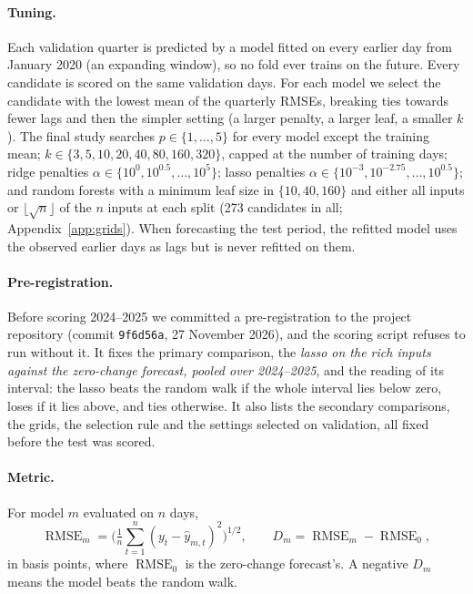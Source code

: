 \documentclass{article}
\newcommand{\RMSE}{\operatorname{RMSE}}
\begin{document}
\paragraph{Tuning.} Each validation quarter is predicted by a model fitted on every earlier day from January 2020 (an expanding window), so no fold ever trains on the future. Every candidate is scored on the same validation days. For each model we select the candidate with the lowest mean of the quarterly RMSEs, breaking ties towards fewer lags and then the simpler setting (a larger penalty, a larger leaf, a smaller $k$). The final study searches $p \in \{1, \ldots, 5\}$ for every model except the training mean; $k \in \{3, 5, 10, 20, 40, 80, 160, 320\}$, capped at the number of training days; ridge penalties $\alpha \in \{10^0, 10^{0.5}, \ldots, 10^5\}$; lasso penalties $\alpha \in \{10^{-3}, 10^{-2.75}, \ldots, 10^{0.5}\}$; and random forests with a minimum leaf size in $\{10, 40, 160\}$ and either all inputs or $\lfloor\sqrt{n}\rfloor$ of the $n$ inputs at each split (273 candidates in all; Appendix~\ref{app:grids}). When forecasting the test period, the refitted model uses the observed earlier days as lags but is never refitted on them.

\paragraph{Pre-registration.} Before scoring 2024--2025 we committed a pre-registration to the project repository (commit \texttt{9f6d56a}, 27 November 2026), and the scoring script refuses to run without it. It fixes the primary comparison, the \emph{lasso on the rich inputs against the zero-change forecast, pooled over 2024--2025}, and the reading of its interval: the lasso beats the random walk if the whole interval lies below zero, loses if it lies above, and ties otherwise. It also lists the secondary comparisons, the grids, the selection rule and the settings selected on validation, all fixed before the test was scored.

\paragraph{Metric.} For model $m$ evaluated on $n$ days,
\begin{equation}
  \RMSE_m = \Big(\tfrac{1}{n}\textstyle\sum_{t=1}^{n} (y_t - \widehat y_{m,t})^2\Big)^{1/2}, \qquad D_m = \RMSE_m - \RMSE_0,
  \label{eq:delta}
\end{equation}
in basis points, where $\RMSE_0$ is the zero-change forecast's. A negative $D_m$ means the model beats the random walk.
\end{document}

